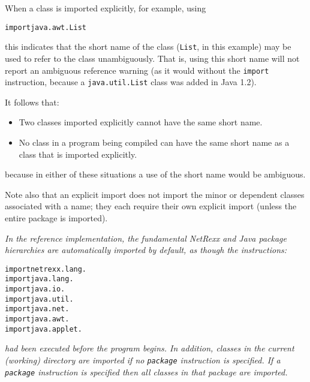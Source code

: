 When a class is imported explicitly, for example, using
\begin{alltt}
import java.awt.List
\end{alltt}
this indicates that the short name of the class (\texttt{List},
in this example) may be used to refer to the class unambiguously.
That is, using this short name will not report an ambiguous reference
warning (as it would without the \texttt{import} instruction, because
a \texttt{java.util.List} class was added in Java 1.2).
 
It follows that:
\begin{itemize}
\item Two classes imported explicitly cannot have the same short name.
\item No class in a program being compiled can have the same short name as
a class that is imported explicitly.
\end{itemize}
because in either of these situations a use of the short name would
be ambiguous.
 
Note also that an explicit import does not import the minor or dependent
classes associated with a name; they each require their own explicit
import (unless the entire package is imported).
 
\emph{In the reference implementation, the fundamental NetRexx and Java
package hierarchies are automatically imported by default, as though the
instructions:}
\begin{alltt}
import netrexx.lang.
import java.lang.
import java.io.
import java.util.
import java.net.
import java.awt.
import java.applet.
\end{alltt}
\emph{had been executed before the program begins.
In addition, classes in the current (working) directory are imported if
no \texttt{package} instruction is specified.  If a \texttt{package}
instruction is specified then all classes in that package are imported.
}
